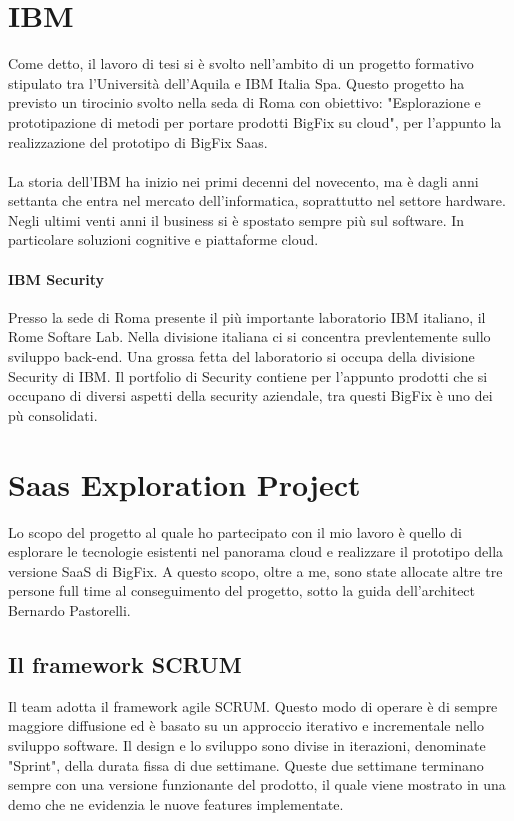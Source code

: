 \section{IBM}
Come detto, il lavoro di tesi si è svolto nell'ambito di un progetto formativo stipulato tra l'Università dell'Aquila e IBM Italia Spa. Questo progetto ha previsto un tirocinio svolto nella seda di Roma con obiettivo: "Esplorazione e prototipazione di metodi per portare prodotti BigFix su cloud", per l'appunto la realizzazione del prototipo di BigFix Saas. 
\paragraph{}
La storia dell'IBM ha inizio nei primi decenni del novecento, ma è dagli anni settanta che entra nel mercato dell'informatica, soprattutto nel settore hardware. Negli ultimi venti anni il business si è spostato sempre più sul software. In particolare soluzioni cognitive e piattaforme cloud.
\paragraph{IBM Security}
Presso la sede di Roma presente il più importante laboratorio IBM italiano, il Rome Softare Lab. Nella divisione italiana ci si concentra prevlentemente sullo sviluppo back-end. Una grossa fetta del laboratorio si occupa della divisione Security di IBM. Il portfolio di Security contiene per l'appunto prodotti che si occupano di diversi aspetti della security aziendale, tra questi BigFix è uno dei pù consolidati.

\section{Saas Exploration Project}
Lo scopo del progetto al quale ho partecipato con il mio lavoro è quello di esplorare le tecnologie esistenti nel panorama cloud e realizzare il prototipo della versione SaaS di BigFix. A questo scopo, oltre a me, sono state allocate altre tre persone full time al conseguimento del progetto, sotto la guida dell'architect Bernardo Pastorelli.
\subsection{Il framework SCRUM}
Il team adotta il framework agile SCRUM. Questo modo di operare è di sempre maggiore diffusione ed è basato su un approccio iterativo e incrementale nello sviluppo software. Il design e lo sviluppo sono divise in iterazioni, denominate "Sprint", della durata fissa di due settimane. Queste due settimane terminano sempre con una versione funzionante del prodotto, il quale viene mostrato in una demo che ne evidenzia le nuove features implementate.
